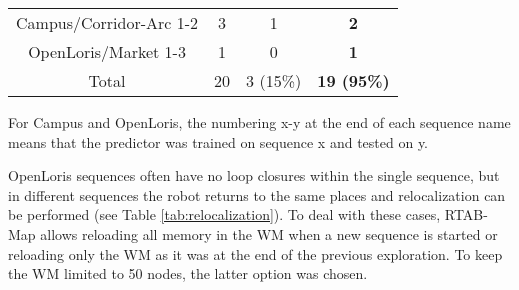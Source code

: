 \documentclass[letterpaper, 10 pt, conference]{ieeeconf}  %
\begin{document}
\begin{table}[t]
{\begin{tabular}{cccc}
Campus/Corridor-Arc 1-2    & 3                                                                    & 1                                                                    & \textbf{2}             \\
OpenLoris/Market 1-3       & 1                                                                    & 0                                                                    & \textbf{1}  \\ 
\hline
Total       & 20                                                                    & 3 (15\%)                                                                    & \textbf{19 (95\%)}  \\ \hline
\end{tabular}}
For Campus and OpenLoris, the numbering x-y at the end of each sequence name means that the predictor was trained on sequence x and tested on y.
\vspace{-0.1cm}
\end{table}

OpenLoris sequences often have no loop closures within the single sequence, but in different sequences the robot returns to the same places and relocalization can be performed (see Table \ref{tab:relocalization}). To deal with these cases, RTAB-Map allows reloading all memory in the WM when a new sequence is started or reloading only the WM as it was at the end of the previous exploration. To keep the WM limited to 50 nodes, the latter option was chosen.
\end{document}
